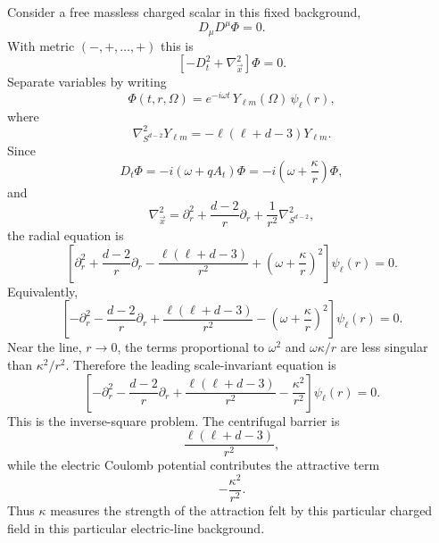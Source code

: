 \documentclass[11pt]{article}
\begin{document}
Consider a free massless charged scalar in this fixed background,
\begin{equation}
  D_\mu D^\mu \Phi=0 .
\end{equation}
With metric $(-,+,\dots,+)$ this is
\begin{equation}
  \left[-D_t^2+\nabla_{\vec x}^2\right]\Phi=0 .
\end{equation}
Separate variables by writing
\begin{equation}
  \Phi(t,r,\Omega)=e^{-i\omega t}\,Y_{\ell m}(\Omega)\,\psi_\ell(r),
\end{equation}
where
\begin{equation}
  \nabla^2_{S^{d-2}}Y_{\ell m}
  =-\ell(\ell+d-3)Y_{\ell m} .
\end{equation}
Since
\begin{equation}
  D_t\Phi=-i\left(\omega+qA_t\right)\Phi
  =-i\left(\omega+\frac{\kappa}{r}\right)\Phi,
\end{equation}
and
\begin{equation}
  \nabla_{\vec x}^2
  =\partial_r^2+\frac{d-2}{r}\partial_r
  +\frac{1}{r^2}\nabla^2_{S^{d-2}},
\end{equation}
the radial equation is
\begin{equation}
  \left[
  \partial_r^2+\frac{d-2}{r}\partial_r
  -\frac{\ell(\ell+d-3)}{r^2}
  +\left(\omega+\frac{\kappa}{r}\right)^2
  \right]\psi_\ell(r)=0 .
  \label{eq:chargedScalarWilsonRadialFull}
\end{equation}
Equivalently,
\begin{equation}
  \left[
  -\partial_r^2-\frac{d-2}{r}\partial_r
  +\frac{\ell(\ell+d-3)}{r^2}
  -\left(\omega+\frac{\kappa}{r}\right)^2
  \right]\psi_\ell(r)=0 .
\end{equation}
Near the line, $r\to0$, the terms proportional to $\omega^2$ and $\omega\kappa/r$ are less singular than $\kappa^2/r^2$.  Therefore the leading scale-invariant equation is
\begin{equation}
  \left[-\partial_r^2-\frac{d-2}{r}\partial_r
  +\frac{\ell(\ell+d-3)}{r^2}
  -\frac{\kappa^2}{r^2}
  \right]\psi_\ell(r)=0 .
  \label{eq:chargedScalarWilsonRadialLeading}
\end{equation}
This is the inverse-square problem.  The centrifugal barrier is
\begin{equation}
  \frac{\ell(\ell+d-3)}{r^2},
\end{equation}
while the electric Coulomb potential contributes the attractive term
\begin{equation}
  -\frac{\kappa^2}{r^2} .
\end{equation}
Thus $\kappa$ measures the strength of the attraction felt by this particular charged field in this particular electric-line background.
\end{document}
